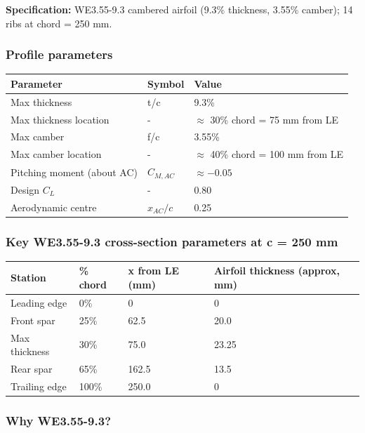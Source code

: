 \documentclass[10pt,a4paper]{article}
\begin{document}
\textbf{Specification:} WE3.55-9.3 cambered airfoil (9.3\% thickness, 3.55\% camber); 14 ribs at chord = 250 mm.

\subsubsection{Profile parameters}

\begin{center}
\begin{tabular}{|l|l|l|}
\hline
Parameter & Symbol & Value \\
\hline
Max thickness & t/c & 9.3\% \\
\hline
Max thickness location & - & $\approx$ 30\% chord = 75 mm from LE \\
\hline
Max camber & f/c & 3.55\% \\
\hline
Max camber location & - & $\approx$ 40\% chord = 100 mm from LE \\
\hline
Pitching moment (about AC) & $C_{M,AC}$ & $\approx -0.05$ \\
\hline
Design $C_L$ & - & 0.80 \\
\hline
Aerodynamic centre & $x_{AC}/c$ & 0.25 \\
\hline
\end{tabular}
\end{center}

\subsubsection{Key WE3.55-9.3 cross-section parameters at c = 250 mm}

\begin{center}
\begin{tabular}{|l|l|l|l|}
\hline
Station & \% chord & x from LE (mm) & Airfoil thickness (approx, mm) \\
\hline
Leading edge & 0\% & 0 & 0 \\
\hline
Front spar & 25\% & 62.5 & 20.0 \\
\hline
Max thickness & 30\% & 75.0 & 23.25 \\
\hline
Rear spar & 65\% & 162.5 & 13.5 \\
\hline
Trailing edge & 100\% & 250.0 & 0 \\
\hline
\end{tabular}
\end{center}

\subsubsection{Why WE3.55-9.3?}
\end{document}
